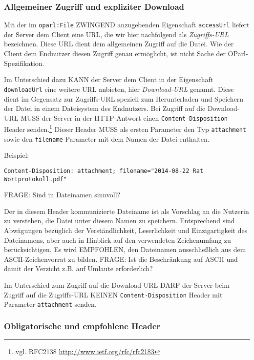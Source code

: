 \documentclass[,a4paper]{article}
\begin{document}
\subsubsection{Allgemeiner Zugriff und expliziter
Download}\label{allgemeiner-zugriff-und-expliziter-download}

Mit der im \texttt{oparl:File} ZWINGEND anzugebenden Eigenschaft
\texttt{accessUrl} liefert der Server dem Client eine URL, die wir hier
nachfolgend als \emph{Zugriffs-URL} bezeichnen. Diese URL dient dem
allgemeinen Zugriff auf die Datei. Wie der Client dem Endnutzer diesen
Zugriff genau ermöglicht, ist nicht Sache der OParl-Spezifikation.

Im Unterschied dazu KANN der Server dem Client in der Eigenschaft
\texttt{downloadUrl} eine weitere URL anbieten, hier \emph{Download-URL}
genannt. Diese dient im Gegensatz zur Zugriffs-URL speziell zum
Herunterladen und Speichern der Datei in einem Dateisystem des
Endnutzers. Bei Zugriff auf die Download-URL MUSS der Server in der
HTTP-Antwort einen \texttt{Content-Disposition} Header senden.\footnote{vgl.
  RFC2138 \url{http://www.ietf.org/rfc/rfc2183}} Dieser Header MUSS als
ersten Parameter den Typ \texttt{attachment} sowie den
\texttt{filename}-Parameter mit dem Namen der Datei enthalten.

Beispiel:

\begin{verbatim}
Content-Disposition: attachment; filename="2014-08-22 Rat Wortprotokoll.pdf"
\end{verbatim}

FRAGE: Sind in Dateinamen sinnvoll?

Der in diesem Header kommunizierte Dateiname ist als Vorschlag an die
Nutzerin zu verstehen, die Datei unter diesem Namen zu speichern.
Entsprechend sind Abwägungen bezüglich der Verständlichkeit,
Leserlichkeit und Einzigartigkeit des Dateinamens, aber auch in Hinblick
auf den verwendeten Zeichenumfang zu berücksichtigen. Es wird EMPFOHLEN,
den Dateinamen ausschließlich aus dem ASCII-Zeichenvorrat zu bilden.
FRAGE: Ist die Beschränkung auf ASCII und damit der Verzicht z.B. auf
Umlaute erforderlich?

Im Unterschied zum Zugriff auf die Download-URL DARF der Server beim
Zugriff auf die Zugriffs-URL KEINEN \texttt{Content-Disposition} Header
mit Parameter \texttt{attachment} senden.

\subsubsection{Obligatorische und empfohlene
Header}\label{obligatorische-und-empfohlene-header}
\end{document}
